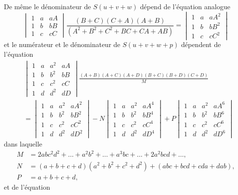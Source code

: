 \documentclass[11pt,a4paper]{book}
\begin{document}
De m\^{e}me le d\'{e}nominateur de $S(u + v + w)$ d\'{e}pend de l'\'{e}quation analogue
\[
\begin{vmatrix}
1 & a & aA \\
1 & b & bB \\
1 & c & cC
\end{vmatrix}
\frac{(B + C)(C + A)(A + B)}{(A^2 + B^2 + C^2 + BC + CA + AB)} =
\begin{vmatrix}
1 & a & aA^2 \\
1 & b & bB^2 \\
1 & c & cC^2
\end{vmatrix}
\]
et le num\'{e}rateur et le d\'{e}nominateur de $S(u + v + w + p)$ d\'{e}pendent de l'\'{e}quation
\begin{align*}
&\begin{vmatrix}
1 & a & a^2 & aA \\
1 & b & b^2 & bB \\
1 & c & c^2 & cC \\
1 & d & d^2 & dD
\end{vmatrix}
\frac{(A + B)(A + C)(A + D)(B + C)(B + D)(C + D)}{M} \\
&= \begin{vmatrix}
1 & a & a^2 & aA^2 \\
1 & b & b^2 & bB^2 \\
1 & c & c^2 & cC^2 \\
1 & d & d^2 & dD^2
\end{vmatrix}
- N
\begin{vmatrix}
1 & a & a^2 & aA^4 \\
1 & b & b^2 & bB^4 \\
1 & c & c^2 & cC^4 \\
1 & d & d^2 & dD^4
\end{vmatrix}
+ P
\begin{vmatrix}
1 & a & a^2 & aA^6 \\
1 & b & b^2 & bB^6 \\
1 & c & c^2 & cC^6 \\
1 & d & d^2 & dD^6
\end{vmatrix}
\end{align*}
dans laquelle
\begin{align*}
M &= 2abc^2d^2 + \ldots + a^2b^2 + \ldots + a^3bc + \ldots + 2a^2bcd + \ldots, \\
N &= (a + b + c + d)(a^2 + b^2 + c^2 + d^2) + (abc + bcd + cda + dab), \\
P &= a + b + c + d,
\end{align*}
et de l'\'{e}quation
\end{document}
